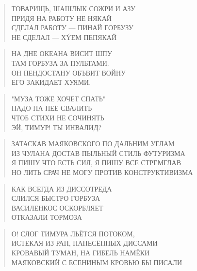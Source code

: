 \poemtitle{***}
\begin{verse}
ТОВАРИЩЬ, ШАШЛЫК СОЖРИ И АЗУ\\
ПРИДЯ НА РАБОТУ НЕ НЯКАЙ\\
СДЕЛАЛ РАБОТУ — ПИНАЙ ГОРБУЗУ\\
НЕ СДЕЛАЛ — ХÝЕМ ПЕПЯКАЙ
\end{verse}

\poemtitle{***}
\begin{verse}
НА ДНЕ ОКЕАНА ВИСИТ ШПУ\\
ТАМ ГОРБУЗА ЗА ПУЛЬТАМИ.\\
ОН ПЕНДОСТАНУ ОБЪВИТ ВОЙНУ\\
ЕГО ЗАКИДАЕТ ХУЯМИ.
\end{verse}

\poemtitle{***}
\begin{verse}
"МУЗА ТОЖЕ ХОЧЕТ СПАТЬ"\\
НАДО НА НЕЁ СВАЛИТЬ\\
ЧТОБ СТИХИ НЕ СОЧИНЯТЬ\\
ЭЙ, ТИМУР! ТЫ ИНВАЛИД?
\end{verse}

\poemtitle{***}
\begin{verse}
ЗАТАСКАВ МАЯКОВСКОГО ПО ДАЛЬНИМ УГЛАМ\\
ИЗ ЧУЛАНА ДОСТАВ ПЫЛЬНЫЙ СТИЛЬ ФУТУРИЗМА\\
Я ПИШУ ЧТО ЕСТЬ СИЛ, Я ПИШУ ВСЕ СТРЕМГЛАВ\\
НО ЛИТЬ СРАЧ НЕ МОГУ ПРОТИВ КОНСТРУКТИВИЗМА
\end{verse}

\poemtitle{***}
\begin{verse}
КАК ВСЕГДА ИЗ ДИССОТРЕДА\\
СЛИЛСЯ БЫСТРО ГОРБУЗА\\
ВАСИЛЕНКОС ОСКОРБЛЯЕТ\\
ОТКАЗАЛИ ТОРМОЗА
\end{verse}

\poemtitle{***}
\begin{verse}
О! СЛОГ ТИМУРА ЛЬЁТСЯ ПОТОКОМ, \\
ИСТЕКАЯ ИЗ РАН, НАНЕСЁННЫХ ДИССАМИ\\
КРОВАВЫЙ ТУМАН, НА ГИБЕЛЬ НАМЁКИ\\
МАЯКОВСКИЙ С ЕСЕНИНЫМ КРОВЬЮ БЫ ПИСАЛИ
\end{verse}


